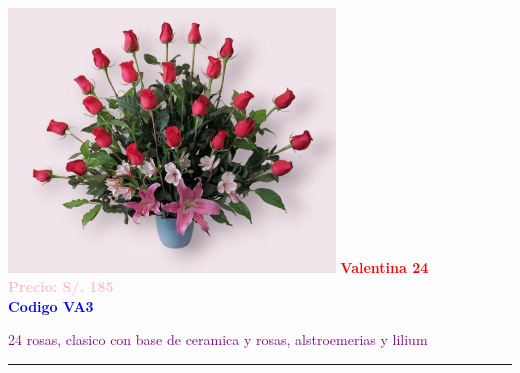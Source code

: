 \begin{multicols}{2}
    \begin{minipage}{\linewidth}
        \centering
        \includegraphics[height=7cm]{imagenes_extraidas/image_10_5} %
        \newline
        \vspace{0.1cm}
        \textbf{\Large \textcolor{red}{Valentina 24}} \\ %
        \vspace{0.2cm}
        \textbf{\textcolor{pink}{Precio: S/. 185}} \\ %
        \vspace{0.2cm}
        \textbf{\textcolor{blue}{Codigo VA3}} \\ %
        \vspace{0.2cm}
        \begin{minipage}{0.8\linewidth} 
            \small \textcolor{purple}{24 rosas, clasico con base de ceramica y rosas, alstroemerias y lilium} %
        \end{minipage}
        \vspace{0.1cm}        
        \rule{\linewidth}{0.5pt}
    \end{minipage}
    

\end{multicols}
